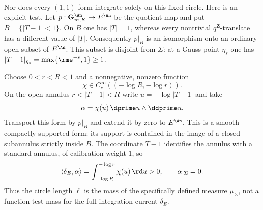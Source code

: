 \begin{example}
Nor does every $(1,1)$-form integrate solely on this fixed circle.
Here is an explicit test.  Let
$p:\mathbf G_{m,K}^{\An}\to E^{\An}$ be the quotient map and put
$B=\{|T-1|<1\}$.  On $B$ one has $|T|=1$, whereas every nontrivial
$q^{\mathbf Z}$-translate has a different value of $|T|$.
Consequently $p|_B$ is an isomorphism onto an ordinary open subset of
$E^{\An}$.  This subset is disjoint from $\Sigma$: at a Gauss point
$\eta_s$ one has $|T-1|_{\eta_s}=\max\{\rme^{-s},1\}\geq1$.

Choose $0<r<R<1$ and a nonnegative, nonzero function
\[
                     \chi\in C_c^\infty((-\log R,-\log r)).
\]
On the open annulus $r<|T-1|<R$ write $u=-\log|T-1|$ and take
\[
                           \alpha=\chi(u)\,\dprime u\wedge\ddprime u.
\]
Transport this form by $p|_B$ and extend it by zero to $E^{\An}$.
This is a smooth compactly supported form: its support is contained
in the image of a closed subannulus strictly inside $B$.
The coordinate $T-1$ identifies the annulus with a standard annulus,
of calibration weight $1$, so
\[
 \langle\delta_E,\alpha\rangle
       =\int_{-\log R}^{-\log r}\chi(u)\,\rd u>0,
                  \qquad \alpha|_\Sigma=0.
\]
Thus the circle length $\ell$ is the mass of the specifically defined
measure $\mu_\Sigma$, not a function-test mass for the full
integration current $\delta_E$.
\end{example}


